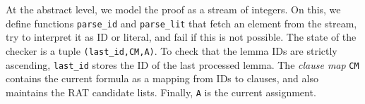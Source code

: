 \documentclass[smallcondensed]{svjour3}     %
\newcommand{\isai}{\lstinline[language=isabelle,basicstyle=\normalsize\ttfamily\slshape]}
\begin{document}
At the abstract level, we model the proof as a stream of integers. On this, we define functions \isai$parse_id$ and \isai$parse_lit$ that fetch an 
element from the stream, try to interpret it as ID or literal, and fail if this is not possible.
The state of the checker is a tuple \isai$(last_id,CM,A)$. To check that the lemma IDs are strictly ascending, \isai{last_id} stores the ID of the last processed lemma.
The \emph{clause map} \isai{CM} contains the current formula as a mapping from IDs to clauses, and also maintains the RAT candidate lists. Finally, \isai$A$ is the current assignment.


% 
% 
\end{document}
